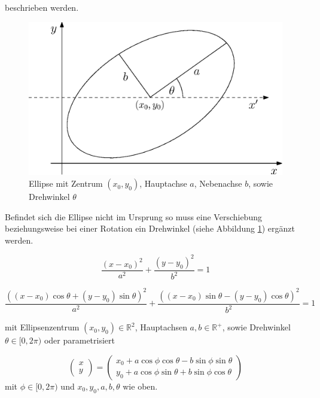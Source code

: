 beschrieben werden.

\begin{figure}[!htb]
	\centering
	\includegraphics[scale=.7]{images/ellipse.eps}
	\caption{Ellipse mit Zentrum $(x_0, y_0)$, Hauptachse $a$, Nebenachse $b$, sowie Drehwinkel $\theta$}
	\label{fig:ellipse}
\end{figure}

Befindet sich die Ellipse nicht im Ursprung so muss eine Verschiebung beziehungsweise bei einer Rotation ein Drehwinkel (siehe Abbildung \ref{fig:ellipse}) ergänzt werden. 

\begin{equation} \label{eq:ellipseNoRotTrans}
\frac{\left(x-x_0\right)^2}{a^2} + \frac{\left(y-y_0\right)^2}{b^2} = 1
\end{equation} 

\begin{equation} \label{eq:ellipseRotTrans}
\frac{((x - x_0)\cos\theta + (y - y_0)\sin\theta)^2}{a^2} + \frac{((x - x_0)\sin\theta - (y - y_0)\cos\theta)^2}{b^2} = 1
\end{equation} 

mit Ellipsenzentrum $(x_0,y_0)\in\mathbb{R}^2$, Hauptachsen $a,b\in\mathbb{R}^+$, sowie Drehwinkel $\theta \in [0,2\pi)$ oder parametrisiert

\begin{equation} \label{eq:ellipseRotTransParam}
\begin{pmatrix}x \\ y\end{pmatrix} = \begin{pmatrix}x_0 + a\cos\phi\cos\theta - b\sin\phi\sin\theta \\ 
y_0 + a\cos\phi\sin\theta + b\sin\phi\cos\theta\end{pmatrix}
\end{equation}
mit $\phi \in [0, 2\pi)$ und $x_0, y_0, a,b, \theta$ wie oben.

